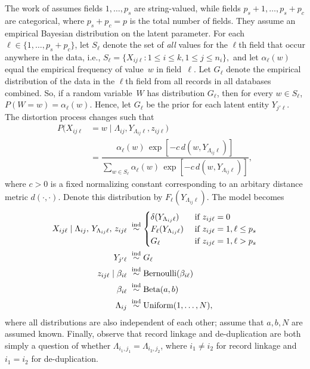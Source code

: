 \documentclass[twoside]{article}
\begin{document}
The work of \cite{steorts15entity} 
assumes  fields $1,\ldots,p_s$ are string-valued, while fields $p_s+1,\ldots,p_s+p_c$ are categorical, where $p_s+p_c=p$ is the total number of fields. They assume an empirical Bayesian distribution on the latent parameter. For each $\ell\in\{1,\ldots,p_s+p_c\}$, let $S_\ell$ denote the set of \emph{all} values for the $\ell$th field
that occur anywhere in the data, i.e.,
$S_\ell=\{X_{ij\ell}:1\le i\le k, 1\le j\le n_i\},$
and let $\alpha_\ell(w)$ equal the empirical frequency of value~$w$ in field~$\ell.$
%
Let $G_\ell$ denote the empirical distribution of the data in the $\ell$th field from all records in all databases combined.  So, if a random variable~$W$ has distribution $G_\ell$, then for every $w\in S_\ell$,
$P(W=w)=\alpha_\ell(w)$.
Hence, let $G_\ell$  be the prior for each latent entity $Y_{j'\ell}$. 
%
The distortion process changes such that
\begin{align*}
P(X_{ij\ell}&=w\mid\Lambda_{ij},Y_{\Lambda_{ij}\ell},z_{ij\ell}) \\
&=\dfrac{\alpha_\ell(w)\,\exp[-c\,d(w,Y_{\Lambda_{ij}\ell})]}{\sum_{w\in S_\ell}\alpha_\ell(w)\,\exp[-c\,d(w,Y_{\Lambda_{ij}\ell})]},
\end{align*}
where $c > 0$ is a fixed normalizing constant corresponding to an arbitary distance metric $d(\cdot,\cdot)$.  Denote this distribution by $F_\ell(Y_{\Lambda_{ij}\ell})$.
The model becomes
\begin{align}
\label{model:string}
X_{ij\ell}\mid \Lambda_{ij},\,Y_{\Lambda_{ij}\ell},\,z_{ij\ell}\;&\stackrel{\text{ind}}{\sim}\begin{cases}\delta(Y_{\Lambda_{ij}\ell})&\text{ if }z_{ij\ell}=0\\F_\ell(Y_{\Lambda_{ij}\ell})&\text{ if }z_{ij\ell}=1, \ell\le p_s\\G_\ell&\text{ if }z_{ij\ell}=1, \ell>p_s\end{cases} \notag \\
Y_{j'\ell}\;&\stackrel{\text{ind}}{\sim}G_\ell \notag \\
z_{ij\ell}\mid\beta_{i\ell}\;&\stackrel{\text{ind}}{\sim}\text{Bernoulli}(\beta_{i\ell}) \notag\\
\beta_{i\ell}\;&\stackrel{\text{ind}}{\sim}\text{Beta}(a,b) \notag \\ 
\Lambda_{ij}\;&\stackrel{\text{ind}}{\sim}\text{Uniform}\left(1,\ldots,N\right),
\end{align}
where all distributions are also independent of each other; assume that $a,b, N$ are assumed known. Finally, observe that record linkage and de-duplication are both simply a question of whether $\Lambda_{i_1,j_1}=\Lambda_{i_2,j_2}$, where $i_1\ne i_2$ for record linkage and $i_1=i_2$ for de-duplication. 
\end{document}
